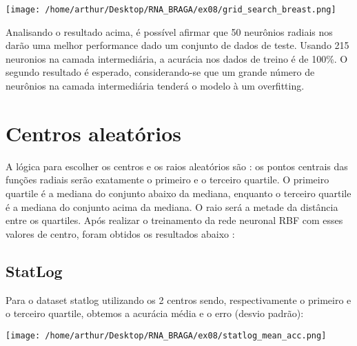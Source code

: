 \documentclass{article}
\begin{document}
\vspace{10pt}

\begin{center}

\texttt{[image: /home/arthur/Desktop/RNA\_BRAGA/ex08/grid\_search\_breast.png]}
        
\end{center}

\vspace{10pt}

Analisando o resultado acima, é possível afirmar que 50 neurônios radiais nos darão uma melhor performance dado um conjunto de dados de teste. Usando 215 neuronios na camada intermediária, a acurácia nos dados de treino é de 100\%. O segundo resultado é esperado, considerando-se que um grande número de neurônios na camada intermediária tenderá o modelo à um overfitting.

\vspace{10pt}



\section{Centros aleatórios}

\vspace{10pt}

A lógica para escolher os centros e os raios aleatórios são : os pontos centrais das funções radiais serão exatamente o primeiro e o terceiro quartile. O primeiro quartile é a mediana do conjunto abaixo da mediana, enquanto o terceiro quartile é a mediana do conjunto acima da mediana. O raio será a metade da distância entre os quartiles. Após realizar o treinamento da rede neuronal RBF com esses valores de centro, foram obtidos os resultados abaixo : 

\vspace{10pt}

\subsection{StatLog}

\vspace{10pt}

Para o dataset statlog utilizando os 2 centros sendo, respectivamente o primeiro e o terceiro quartile, obtemos a acurácia média e o erro (desvio padrão): 

\begin{center}

\texttt{[image: /home/arthur/Desktop/RNA\_BRAGA/ex08/statlog\_mean\_acc.png]}
            
\end{center}
\end{document}

